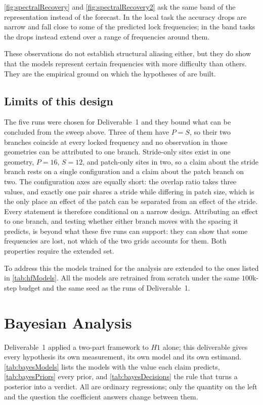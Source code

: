 \autoref{fig:spectralRecovery} and \autoref{fig:spectralRecovery2} ask the same band of the representation instead of the forecast. In the local task the accuracy drops are narrow and fall close to some of the predicted lock frequencies; in the band tasks the drops instead extend over a range of frequencies around them.

These observations do not establish structural aliasing either, but they do show that the models represent certain frequencies with more difficulty than others. They are the empirical ground on which the hypotheses of  are built.



\subsection{Limits of this design}
The five runs were chosen for Deliverable~1 and they bound what can be concluded from the sweep above. Three of them have $P=S$, so their two branches coincide at every locked frequency and no observation in those geometries can be attributed to one branch. Stride-only sites exist in one geometry, $P{=}16,\,S{=}12$, and patch-only sites in two, so a claim about the stride branch rests on a single configuration and a claim about the patch branch on two. The configuration axes are equally short: the overlap ratio takes three values, and exactly one pair shares a stride while differing in patch size, which is the only place an effect of the patch can be separated from an effect of the stride. Every statement is therefore conditional on a narrow design. Attributing an effect to one branch, and testing whether either branch moves with the spacing it predicts, is beyond what these five runs can support: they can show that some frequencies are lost, not which of the two grids accounts for them. Both properties require the extended set.

To address this the models trained for the analysis are extended to the ones listed in \autoref{tab:hfModels}. All the models are retrained from scratch under the same $100$k-step budget and the same seed as the runs of Deliverable~1.



\section{Bayesian Analysis}
\label{sec:bayes}

Deliverable~1 applied a two-part framework to $H1$ alone; this deliverable gives every hypothesis its own measurement, its own model and its own estimand. \autoref{tab:bayesModels} lists the models with the value each claim predicts, \autoref{tab:bayesPriors} every prior, and \autoref{tab:bayesDecisions} the rule that turns a posterior into a verdict. All are ordinary regressions; only the quantity on the left and the question the coefficient answers change between them.

